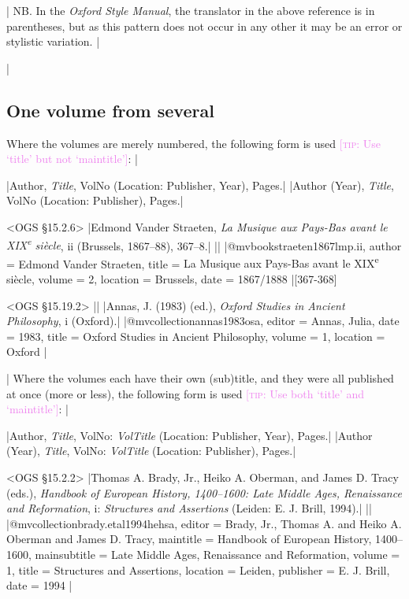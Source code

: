 \documentclass[extrafontsizes,11pt,a4paper,oneside]{memoir}
\newcommand*{\code}[1]{`\textsf{#1}'}
\newcommand*{\aside}[1]{\textcolor{violet}{[\textsc{tip:} #1]}}
\begin{document}
\todoc[oxnotes]|
NB. In the \emph{Oxford Style Manual}, the translator in the above reference is in parentheses,
but as this pattern does not occur in any other it may be an error or stylistic variation.
|

\todoc|
\subsection{One volume from several}

Where the volumes are merely numbered, the following form is used
\aside{Use \code{title} but not \code{maintitle}}:
|

\specs
|Author, \emph{Title}, VolNo (Location: Publisher, Year), Pages.|%
|Author (Year), \emph{Title}, VolNo (Location: Publisher), Pages.|

\bibexample<OGS \S15.2.6>
|Edmond Vander Straeten, \emph{La Musique aux Pays-Bas avant le XIX\textsuperscript{e} siècle}, ii (Brussels, 1867--88), 367--8.|%
||%
|@mvbook{straeten1867lmp.ii,
  author = {Edmond {Vander Straeten}},
  title = {La Musique aux Pays-Bas avant le XIX\textsuperscript{e} siècle},
  volume = {2},
  location = {Brussels},
  date = {1867/1888}
}|[367-368]

\bibexample<OGS \S15.19.2>
||%
|Annas, J. (1983) (ed.), \emph{Oxford Studies in Ancient Philosophy}, i (Oxford).|%
|@mvcollection{annas1983osa,
  editor = {Annas, Julia},
  date = {1983},
  title = {Oxford Studies in Ancient Philosophy},
  volume = {1},
  location = {Oxford}
}|

\todoc|
Where the volumes each have their own (sub)title,
and they were all published at once (more or less),
the following form is used \aside{Use both \code{title} and \code{maintitle}}:
|

\specs
|Author, \emph{Title}, VolNo: \emph{VolTitle} (Location: Publisher, Year), Pages.|%
|Author (Year), \emph{Title}, VolNo: \emph{VolTitle} (Location: Publisher), Pages.|

\bibexample<OGS \S15.2.2>
|Thomas A. Brady, Jr., Heiko A. Oberman, and James D. Tracy (eds.), \emph{Handbook of European History, 1400–1600: Late Middle Ages, Renaissance and Reformation}, i: \emph{Structures and Assertions} (Leiden: E. J. Brill, 1994).|%
||%
|@mvcollection{brady.etal1994hehsa,
  editor = {Brady, Jr., Thomas A. and Heiko A. Oberman and James D. Tracy},
  maintitle = {Handbook of European History, 1400–1600},
  mainsubtitle = {{Late} {Middle} {Ages,} {Renaissance} and {Reformation}},
  volume = {1},
  title = {Structures and Assertions},
  location = {Leiden},
  publisher = {E. J. Brill},
  date = {1994}
}|
\end{document}
